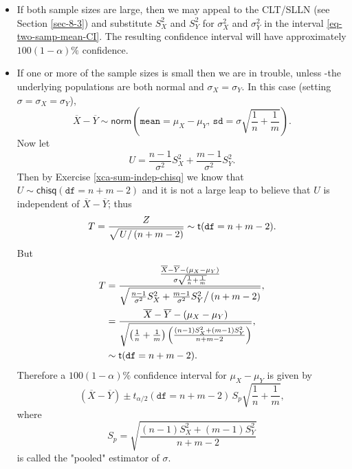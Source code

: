 \begin{itemize}
\item If both sample sizes are large, then we may appeal to the CLT/SLLN
(see Section \ref{sec-8-3}) and substitute \(S_{X}^{2}\) and
\(S_{Y}^{2}\) for \(\sigma_{X}^{2}\) and \(\sigma_{Y}^{2}\) in the
interval \eqref{eq-two-samp-mean-CI}. The resulting confidence interval will
have approximately \(100(1-\alpha)\%\) confidence.
\item If one or more of the sample sizes is small then we are in trouble,
unless -the underlying populations are both normal and
\(\sigma_{X}=\sigma_{Y}\). In this case (setting
\(\sigma=\sigma_{X}=\sigma_{Y}\)),
\begin{equation}
\overline{X}-\overline{Y}\sim\mathsf{norm}\left(\mathtt{mean}=\mu_{X}-\mu_{Y},\,\mathtt{sd}=\sigma\sqrt{\frac{1}{n}+\frac{1}{m}}\right).
\end{equation} 
Now let
\begin{equation}
U=\frac{n-1}{\sigma^{2}}S_{X}^{2}+\frac{m-1}{\sigma^{2}}S_{Y}^{2}.
\end{equation}
Then by Exercise \ref{xca-sum-indep-chisq} we know that
\(U\sim\mathsf{chisq}(\mathtt{df}=n+m-2)\) and it is not a large
leap to believe that \(U\) is independent of
\(\overline{X}-\overline{Y}\); thus
\begin{equation}
T = \frac{Z}{\sqrt{\left.U\right/ (n+m-2)}}\sim\mathsf{t}(\mathtt{df}=n+m-2).
\end{equation}
But
\begin{align*}
T & =\frac{\frac{\overline{X}-\overline{Y}-(\mu_{X}-\mu_{Y})}{\sigma\sqrt{\frac{1}{n}+\frac{1}{m}}}}{\sqrt{\left.\frac{n-1}{\sigma^{2}}S_{X}^{2}+\frac{m-1}{\sigma^{2}}S_{Y}^{2}\right/ (n+m-2)}},\\
& =\frac{\overline{X}-\overline{Y}-(\mu_{X}-\mu_{Y})}{\sqrt{\left(\frac{1}{n}+\frac{1}{m}\right)\left(\frac{(n-1)S_{X}^{2}+(m-1)S_{Y}^{2}}{n+m-2}\right)}},\\
& \sim\mathsf{t}(\mathtt{df}=n+m-2).
\end{align*}
Therefore a \(100(1-\alpha)\%\) confidence interval for
\(\mu_{X}-\mu_{Y}\) is given by
\begin{equation}
\left(\overline{X}-\overline{Y}\right)\pm t_{\alpha/2}(\mathtt{df}=n+m-2)\, S_{p}\sqrt{\frac{1}{n}+\frac{1}{m}},
\end{equation}
where
\begin{equation}
S_{p}=\sqrt{\frac{(n-1)S_{X}^{2}+(m-1)S_{Y}^{2}}{n+m-2}}
\end{equation}
is called the "pooled" estimator of \(\sigma\).

\end{itemize}
